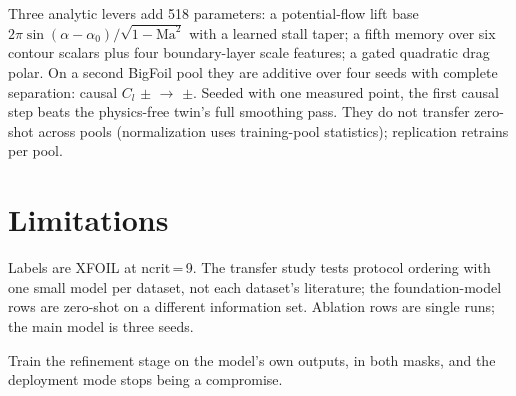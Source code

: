 \documentclass{article}
\begin{document}
Three analytic levers add 518 parameters: a potential-flow lift base $2\pi\sin(\alpha-\alpha_0)/\sqrt{1-\mathrm{Ma}^2}$ with a learned stall taper; a fifth memory over six contour scalars plus four boundary-layer scale features; a gated quadratic drag polar. On a second BigFoil pool they are additive over four seeds with complete separation: causal $C_l$ \BaseClAR$\pm$\BaseClStd{} $\rightarrow$ \PhysClAR$\pm$\PhysClStd. Seeded with one measured point, the first causal step beats the physics-free twin's full smoothing pass. They do not transfer zero-shot across pools (normalization uses training-pool statistics); replication retrains per pool.

\section{Limitations}
\label{sec:limits}
Labels are XFOIL at ncrit\,=\,9. The transfer study tests protocol ordering with one small model per dataset, not each dataset's literature; the foundation-model rows are zero-shot on a different information set. Ablation rows are single runs; the main model is three seeds.

Train the refinement stage on the model's own outputs, in both masks, and the deployment mode stops being a compromise.


\end{document}

